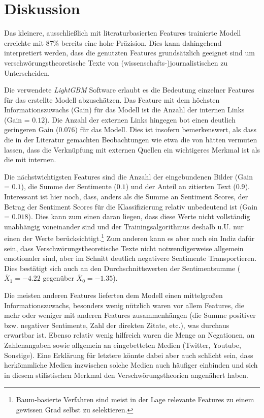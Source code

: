 \section{Diskussion}

Das kleinere, ausschließlich mit literaturbasierten Features trainierte Modell erreichte mit 87\% bereits eine hohe Präzision.
Dies kann dahingehend interpretiert werden, dass die genutzten Features grundsätzlich geeignet sind um verschwörungstheoretische Texte von (wissenschafts-)journalistischen zu Unterscheiden.

Die verwendete \textit{LightGBM} Software erlaubt es die Bedeutung einzelner Features für das erstellte Modell abzuschätzen.
Das Feature mit dem höchsten Informationszuwachs (Gain) für das Modell ist die Anzahl der internen Links (Gain = $0.12$).
Die Anzahl der externen Links hingegen bot einen deutlich geringeren Gain ($0.076$) für das Modell.
Dies ist insofern bemerkenswert, als dass die in der Literatur gemachten Beobachtungen wie etwa die von \textcite[10]{soukup_2008} hätten vermuten lassen, dass die Verknüpfung mit externen Quellen ein wichtigeres Merkmal ist als die mit internen.

Die nächstwichtigsten Features sind die Anzahl der eingebundenen Bilder (Gain = $0.1$), die Summe der Sentimente ($0.1$) und der Anteil an zitierten Text ($0.9$).
Interessant ist hier noch, dass, anders als die Summe an Sentiment Scores, der Betrag der Sentiment Scores für die Klassifizierung relativ unbedeutend ist (Gain = $0.018$).
Dies kann zum einen daran liegen, dass diese Werte nicht vollständig unabhängig voneinander sind und der Trainingsalgorithmus deshalb u.U. nur einen der Werte berücksichtigt.\footnote{Baum-basierte Verfahren sind meist in der Lage relevante Features zu einem gewissen Grad selbst zu selektieren.}
Zum anderen kann es aber auch ein Indiz dafür sein, dass Verschwörungstheoretische Texte nicht notwendigerweise allgemein emotionaler sind, aber im Schnitt deutlich negativere Sentimente Transportieren.
Dies bestätigt sich auch an den Durchschnittswerten der Sentimentsumme ($\overline{X}_1 = -4.22$ gegenüber $\overline{X}_0 = -1.35$).

Die meisten anderen Features lieferten dem Modell einen mittelgroßen Informationszuwachs, besonders wenig nützlich waren vor allem Features, die mehr oder weniger mit anderen Features zusammenhängen (die Summe positiver bzw. negativer Sentimente, Zahl der direkten Zitate, etc.), was durchaus erwartbar ist.
Ebenso relativ wenig hilfreich waren die Menge an Negationen, an Zahlenangaben sowie allgemein an eingebetteten Medien (Twitter, Youtube, Sonstige).
Eine Erklärung für letztere könnte dabei aber auch schlicht sein, dass herkömmliche Medien inzwischen solche Medien auch häufiger einbinden und sich in diesem stilistischen Merkmal den Verschwörungstheorien angenähert haben.

